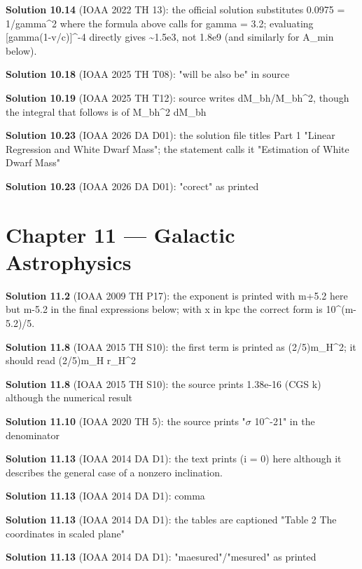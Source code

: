 \noindent\textbf{Solution 10.14} (IOAA 2022 TH 13): the official solution substitutes 0.0975 = 1/gamma\^{}2 where the formula above calls for gamma = 3.2; evaluating [gamma(1-v/c)]\^{}{-4} directly gives \textasciitilde{}1.5e3, not 1.8e9 (and similarly for A\_min below).
\smallskip

\noindent\textbf{Solution 10.18} (IOAA 2025 TH T08): "will be also be" in source
\smallskip

\noindent\textbf{Solution 10.19} (IOAA 2025 TH T12): source writes dM\_bh/M\_bh\^{}2, though the integral that follows is of M\_bh\^{}2 dM\_bh
\smallskip

\noindent\textbf{Solution 10.23} (IOAA 2026 DA D01): the solution file titles Part 1 "Linear Regression and White Dwarf Mass"; the statement calls it "Estimation of White Dwarf Mass"
\smallskip

\noindent\textbf{Solution 10.23} (IOAA 2026 DA D01): "corect" as printed
\smallskip

\section*{Chapter 11 --- Galactic Astrophysics}

\noindent\textbf{Solution 11.2} (IOAA 2009 TH P17): the exponent is printed with m+5.2 here but m-5.2 in the final expressions below; with x in kpc the correct form is 10\^{}{(m-5.2)/5}.
\smallskip

\noindent\textbf{Solution 11.8} (IOAA 2015 TH S10): the first term is printed as (2/5)m\_H\^{}2; it should read (2/5)m\_H r\_H\^{}2
\smallskip

\noindent\textbf{Solution 11.8} (IOAA 2015 TH S10): the source prints 1.38e-16 (CGS k) although the numerical result
\smallskip

\noindent\textbf{Solution 11.10} (IOAA 2020 TH 5): the source prints "$\sigma$ 10\^{}{-21}" in the denominator
\smallskip

\noindent\textbf{Solution 11.13} (IOAA 2014 DA D1): the text prints (i = 0) here although it describes the general case of a nonzero inclination.
\smallskip

\noindent\textbf{Solution 11.13} (IOAA 2014 DA D1): comma
\smallskip

\noindent\textbf{Solution 11.13} (IOAA 2014 DA D1): the tables are captioned "Table 2 The coordinates in scaled plane"
\smallskip

\noindent\textbf{Solution 11.13} (IOAA 2014 DA D1): "maesured"/"mesured" as printed
\smallskip

